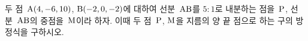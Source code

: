 두 점~$\mathrm{A}(4{,}\mkern3mu\mathopen{}-6{,}\mkern3mu\mathopen{}10)$, $\mathrm{B}(-2{,}\mkern3mu\mathopen{}0{,}\mkern3mu\mathopen{}-2)$에 대하여 선분~$\mathrm{AB}$를 $5:1$로 내분하는 점을~$\mathrm{P}$, 선분~$\mathrm{AB}$의 중점을~$\mathrm{M}$이라 하자. 이때 두 점~$\mathrm{P}$, $\mathrm{M}$을 지름의 양 끝 점으로 하는 구의 방정식을 구하시오.
